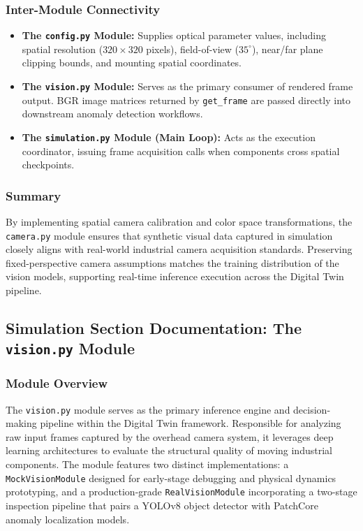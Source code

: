 \documentclass{article}
\begin{document}
\subsubsection{Inter-Module Connectivity}
\begin{itemize}
	\item \textbf{The \texttt{config.py} Module:} Supplies optical parameter values, including spatial resolution ($320 \times 320$ pixels), field-of-view ($35^\circ$), near/far plane clipping bounds, and mounting spatial coordinates.
	\item \textbf{The \texttt{vision.py} Module:} Serves as the primary consumer of rendered frame output. BGR image matrices returned by \texttt{get\_frame} are passed directly into downstream anomaly detection workflows.
	\item \textbf{The \texttt{simulation.py} Module (Main Loop):} Acts as the execution coordinator, issuing frame acquisition calls when components cross spatial checkpoints.
	\end{itemize}
		
\subsubsection{Summary}
By implementing spatial camera calibration and color space transformations, the \texttt{camera.py} module ensures that synthetic visual data captured in simulation closely aligns with real-world industrial camera acquisition standards. Preserving fixed-perspective camera assumptions matches the training distribution of the vision models, supporting real-time inference execution across the Digital Twin pipeline.


\subsection{Simulation Section Documentation: The \texttt{vision.py} Module}

\subsubsection{Module Overview}
The \texttt{vision.py} module serves as the primary inference engine and decision-making pipeline within the Digital Twin framework. Responsible for analyzing raw input frames captured by the overhead camera system, it leverages deep learning architectures to evaluate the structural quality of moving industrial components. The module features two distinct implementations: a \texttt{MockVisionModule} designed for early-stage debugging and physical dynamics prototyping, and a production-grade \texttt{RealVisionModule} incorporating a two-stage inspection pipeline that pairs a YOLOv8 object detector with PatchCore anomaly localization models.
\end{document}
